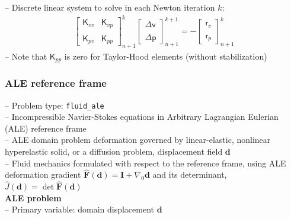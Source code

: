 \documentclass[a4paper,12pt]{report}
\newcommand{\bs}[1]{\boldsymbol{#1}}
\newcommand{\ROP}{\bs{\mathsf{r}}}
\begin{document}
-- Discrete linear system to solve in each Newton iteration $k$:
\begin{equation}
\label{equation-lin-sys-fluid}
\begin{aligned}
\begin{bmatrix} \boldsymbol{\mathsf{K}}_{vv} & \boldsymbol{\mathsf{K}}_{vp} \\ \\ \boldsymbol{\mathsf{K}}_{pv} & \boldsymbol{\mathsf{K}}_{pp} \end{bmatrix}_{n+1}^{k}\begin{bmatrix} \Delta\boldsymbol{\mathsf{v}} \\ \\ \Delta\boldsymbol{\mathsf{p}} \end{bmatrix}_{n+1}^{k+1}=-\begin{bmatrix} \ROP_{v} \\ \\ \ROP_{p} \end{bmatrix}_{n+1}^{k}
\end{aligned}
\end{equation}
-- Note that $\boldsymbol{\mathsf{K}}_{pp}$ is zero for Taylor-Hood elements (without stabilization)

\subsubsection{ALE reference frame}\label{ale-reference-frame}

-- Problem type: \verb.fluid_ale.\\

-- Incompressible Navier-Stokes equations in Arbitrary Lagrangian Eulerian (ALE) reference frame\\

-- ALE domain problem deformation governed by linear-elastic, nonlinear hyperelastic solid, or a diffusion problem, displacement field $\boldsymbol{d}$\\

-- Fluid mechanics formulated with respect to the reference frame, using ALE deformation gradient $\widehat{\boldsymbol{F}}(\boldsymbol{d}) = \boldsymbol{I} + \nabla_0\boldsymbol{d}$ and its determinant, $\widehat{J}(\boldsymbol{d})=\det \widehat{\boldsymbol{F}}(\boldsymbol{d})$\\

\textbf{ALE problem}\\

-- Primary variable: domain displacement $\boldsymbol{d}$\\
\end{document}
